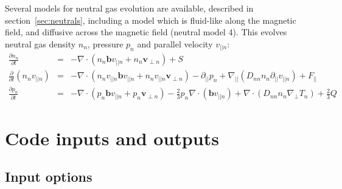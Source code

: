 \documentclass[12pt,a4paper]{article}
\begin{document}
Several models for neutral gas evolution are available, described in section~\ref{sec:neutrals}, including a model which is fluid-like along the magnetic field, and diffusive across the magnetic field (neutral model 4). This evolves neutral gas density $n_n$, pressure $p_n$ and parallel velocity $v_{||n}$:
\begin{eqnarray}
  \frac{\partial n_n}{\partial t} &=& -\nabla\cdot\left(n_n\mathbf{b}v_{||n} + n_n\mathbf{v}_{\perp n}\right) + S\\
  \frac{\partial}{\partial t}\left(n_nv_{||n}\right) &=& -\nabla\cdot\left(n_nv_{||n} \mathbf{b}v_{||n} + n_nv_{||n}\mathbf{v}_{\perp n}\right) - \partial_{||}p_n + \nabla_{||}\left(D_{nn}n_n\partial_{||}v_{||n}\right) + F_{||} \\
  \frac{\partial p_n}{\partial t} &=& -\nabla\cdot\left(p_n\mathbf{b}v_{||n} + p_n\mathbf{v}_{\perp n}\right) - \frac{2}{3}p_n\nabla\cdot\left(\mathbf{b}v_{||n}\right) + \nabla\cdot\left(D_{nn}n_n\nabla_\perp T_n\right) + \frac{2}{3}Q
\end{eqnarray}

\section{Code inputs and outputs}

\subsection{Input options}
\end{document}
